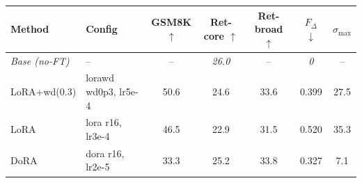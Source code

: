 \begin{tabular}{l l c c c c c}
\toprule
Method & Config & GSM8K $\uparrow$ & Ret-core $\uparrow$ & Ret-broad $\uparrow$ & $F_{\Delta}$ $\downarrow$ & $\sigma_{\max}$ \\
\midrule
\textit{Base (no-FT)} & -- & -- & \textit{26.0} & -- & \textit{0} & -- \\
\midrule
LoRA+wd(0.3) & lorawd wd0p3, lr5e-4 & 50.6 & 24.6 & 33.6 & 0.399 & 27.5 \\
LoRA & lora r16, lr3e-4 & 46.5 & 22.9 & 31.5 & 0.520 & 35.3 \\
DoRA & dora r16, lr2e-5 & 33.3 & 25.2 & 33.8 & 0.327 & 7.1 \\
\bottomrule
\end{tabular}

